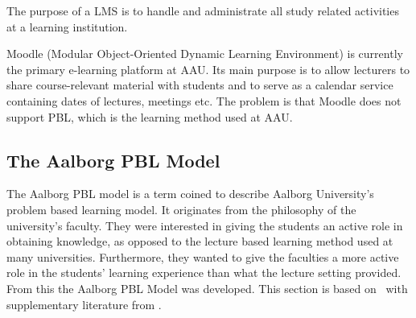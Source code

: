 The purpose of a LMS is to handle and administrate all study related activities at a learning institution.%

Moodle (Modular Object-Oriented Dynamic Learning Environment) \citep{moodle} is currently the primary e-learning platform at AAU. 
Its main purpose is to allow lecturers to share course-relevant material with students and to serve as a calendar service containing dates of lectures, meetings etc. 
The problem is that Moodle does not support PBL, which is the learning method used at AAU.

\subsection{The Aalborg PBL Model}
\label{sub:aaupbl}
The Aalborg PBL model is a term coined to describe Aalborg University's problem based learning model. 
It originates from the philosophy of the university's faculty. 
They were interested in giving the students an active role in obtaining knowledge, as opposed to the lecture based learning method used at many universities.
Furthermore, they wanted to give the faculties a more active role in the students' learning experience than what the lecture setting provided. 
From this the Aalborg PBL Model was developed. 
This section is based on~\citep{Barge10} with supplementary literature from \cite[pp.~9-16]{theaalborgpblmodel2004}.
